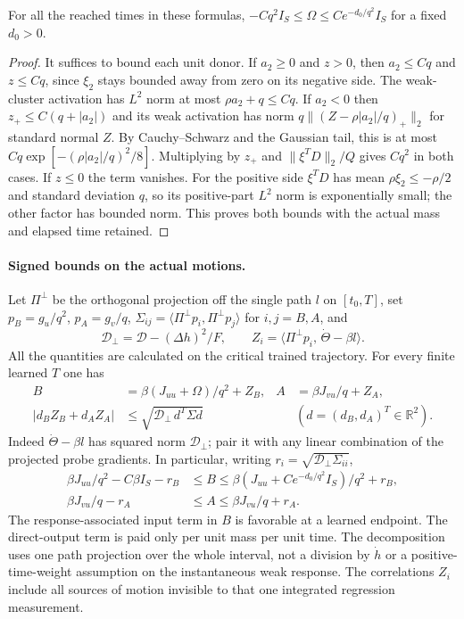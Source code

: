 \documentclass[11pt]{article}
\begin{document}
\begin{lemma}\label{an04spmv1:overlap}
For all the reached times in these formulas,
$-Cq^2 I_S\le\Omega\le C e^{-d_0/q^2}I_S$ for a fixed $d_0>0$.
\end{lemma}
\begin{proof}
It suffices to bound each unit donor. If $a_2\ge0$ and $z>0$,
then $a_2\le Cq$ and $z\le Cq$, since $\xi_2$ stays bounded
away from zero on its negative side. The weak-cluster activation
has $L^2$ norm at most $\rho a_2+q\le Cq$. If $a_2<0$ then
$z_+\le C(q+|a_2|)$ and its weak activation has norm
$q\| (Z-\rho |a_2|/q)_+\|_2$ for standard normal $Z$.
By Cauchy--Schwarz and the Gaussian tail, this is at most
$Cq\exp[-(\rho |a_2|/q)^2/8]$.
Multiplying by $z_+$ and $\|\xi^TD\|_2/Q$ gives $Cq^2$ in
both cases. If $z\le0$ the term vanishes. For the positive side
$\xi^TD$ has mean $\rho\xi_2\le-\rho/2$ and standard deviation
$q$, so its positive-part $L^2$ norm is exponentially small;
the other factor has bounded norm. This proves both bounds with
the actual mass and elapsed time retained.
\end{proof}

\paragraph{Signed bounds on the actual motions.}
Let $\Pi^\perp$ be the orthogonal projection off the single path
$l$ on $[t_0,T]$, set $p_B=g_u/q^2$, $p_A=g_v/q$,
$\Sigma_{ij}=\langle\Pi^\perp p_i,\Pi^\perp p_j\rangle$
for $i,j=B,A$, and
\[
 \mathcal D_\perp=\mathcal D-(\Delta h)^2/F,\qquad
 Z_i=\langle \Pi^\perp p_i,\,\dot\Theta-\beta l\rangle .
\]
All the quantities are calculated on the critical trained trajectory.
For every finite learned $T$ one has
\begin{align}
 B&=\beta(J_{uu}+\Omega)/q^2+ Z_B,&
 A&=\beta J_{vu}/q+Z_A,\label{an04spmv1:split}\\
 |d_B Z_B+d_A Z_A|&\le
 \sqrt{\mathcal D_\perp\,d^T\Sigma d}
 &&(d=(d_B,d_A)^T\in\mathbb R^2). \label{an04spmv1:ellipse}
\end{align}
Indeed $\dot\Theta-\beta l$ has squared norm $\mathcal D_\perp$;
pair it with any linear combination of the projected probe gradients.
In particular, writing $r_i=\sqrt{\mathcal D_\perp\Sigma_{ii}}$,
\begin{align*}
 \beta J_{uu}/q^2-C\beta I_S-r_B
 &\le B\le\beta(J_{uu}+C e^{-d_0/q^2}I_S)/q^2+r_B,\\
 \beta J_{vu}/q-r_A&\le A\le\beta J_{vu}/q+r_A .
\end{align*}
The response-associated input term in $B$ is favorable at a
learned endpoint. The direct-output term is paid only per unit mass
per unit time. The decomposition uses one path projection over the
whole interval, not a division by $\dot h$ or a positive-time-weight
assumption on the instantaneous weak response. The correlations $Z_i$
include all sources of motion invisible to that one integrated
regression measurement.
\end{document}
